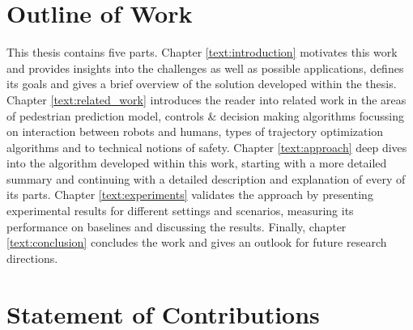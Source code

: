 \section{Outline of Work}
\label{text:introduction/outline}
This thesis contains five parts. Chapter \ref{text:introduction} motivates this work and provides insights into the challenges as well as possible applications, defines its goals and gives a brief overview of the solution developed within the thesis. Chapter \ref{text:related_work} introduces the reader into related work in the areas of pedestrian prediction model, controls \& decision making algorithms focussing on interaction between robots and humans, types of trajectory optimization algorithms and to technical notions of safety. Chapter \ref{text:approach} deep dives into the algorithm developed within this work, starting with a more detailed summary and continuing with a detailed description and explanation of every of its parts. Chapter \ref{text:experiments} validates the approach by presenting experimental results for different settings and scenarios, measuring its performance on baselines and discussing the results. Finally, chapter \ref{text:conclusion} concludes the work and gives an outlook for future research directions.

\section{Statement of Contributions}
\label{text:introduction/contributions}

